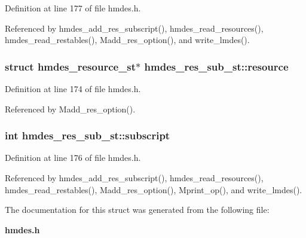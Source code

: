 Definition at line 177 of file hmdes.h.

Referenced by hmdes\_\-add\_\-res\_\-subscript(), hmdes\_\-read\_\-resources(), hmdes\_\-read\_\-restables(), Madd\_\-res\_\-option(), and write\_\-lmdes().
\subsubsection{\setlength{\rightskip}{0pt plus 5cm}struct \bf{hmdes\_\-resource\_\-st}$\ast$ \bf{hmdes\_\-res\_\-sub\_\-st::resource}}\label{structhmdes__res__sub__st_aec375db03cc736acf62edf2c9a223e0}




Definition at line 174 of file hmdes.h.

Referenced by Madd\_\-res\_\-option().
\subsubsection{\setlength{\rightskip}{0pt plus 5cm}int \bf{hmdes\_\-res\_\-sub\_\-st::subscript}}\label{structhmdes__res__sub__st_2ffdefd39ebe287898f0f8a653387b36}




Definition at line 176 of file hmdes.h.

Referenced by hmdes\_\-add\_\-res\_\-subscript(), hmdes\_\-read\_\-resources(), hmdes\_\-read\_\-restables(), Madd\_\-res\_\-option(), Mprint\_\-op(), and write\_\-lmdes().

The documentation for this struct was generated from the following file:\begin{CompactItemize}
\item 
\bf{hmdes.h}\end{CompactItemize}
